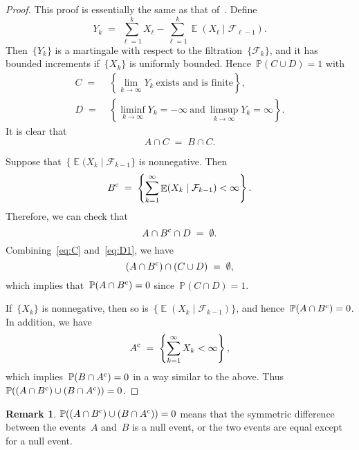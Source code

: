 \documentclass[12pt,a4paper]{article}  %
\newcounter{cite}
\theoremstyle{definition}
\newtheorem{remark}{Remark}[section]
\numberwithin{equation}{section}
\newcommand{\FF}{\mathcal{F}}
\newcommand{\comp}{{\textnormal{c}}}
\DeclareMathOperator{\expc}{\mathbb{E}}
\renewcommand{\Pr}{\mathbb{P}}
\begin{document}
\begin{proof}
    This proof is essentially the same as that of~\cite[Theorem~4.3.4]{Durrett_2019}.
    Define
    \[
        Y_k \;=\;  \sum_{\ell = 1}^{k} X_\ell - \sum_{\ell = 1}^{k} \expc(X_\ell\mathrel{|}
        \FF_{\ell-1}).
    \]
    Then~$\{Y_k\}$ is a martingale with respect to the filtration~$\{\FF_k\}$, and it has bounded
    increments if~$\{X_k\}$ is uniformly bounded.
    Hence~$\Pr(C\cup D) = 1$ with
    \begin{align*}
        C \;=\; & \left\{ \lim_{k\to\infty} Y_k~\text{exists and is finite} \right\}, \\
        D \;=\; & \left\{ \liminf_{k\to \infty} Y_k = -\infty~\text{and}~\limsup_{k\to \infty} Y_k = \infty \right\}.
    \end{align*}
    It is clear that
    \begin{equation}
        \label{eq:C}
        A\cap C \;=\; B\cap C.
    \end{equation}

    Suppose that~$\{\expc(X_k\mathrel{|}\FF_{k-1}\}$ is nonnegative. Then
        \[
            B^\comp \;=\;  \left\{ \sum_{k=1}^\infty \expc(X_k\mathrel{|}\FF_{k-1}) <\infty \right\}.
        \]
    Therefore, we can check that
    \begin{equation}
        \label{eq:D1}
        A \cap B^\comp \cap D \;=\; \emptyset.
    \end{equation}
    Combining~\eqref{eq:C} and~\eqref{eq:D1}, we have
    \[
        (A \cap B^\comp) \cap (C\cup D) \;=\; \emptyset,
    \]
    which implies that~$\Pr(A\cap B^\comp) = 0$ since~$\Pr(C\cap D) = 1$.

    If~$\{X_k\}$ is nonnegative,  then so is~$\{\expc(X_k\mathrel{|}\FF_{k-1})\}$,
    and hence~$\Pr(A\cap B^\comp) = 0$. In addition, we have
    \[
        A^\comp \;=\;  \left\{ \sum_{k=1}^\infty X_k <\infty \right\},
    \]
    which implies~$\Pr(B\cap A^\comp) = 0$ in a way similar to the above.
    Thus~$\Pr((A \cap B^\comp) \cup (B\cap A^\comp)) = 0$.
\end{proof}

\begin{remark}
    \label{rem:equal}
     $\Pr((A \cap B^\comp) \cup (B\cap A^\comp)) = 0$ means that the symmetric difference between
     the events~$A$ and~$B$ is a null event, or the two events are equal except for a null event.
\end{remark}
\end{document}
